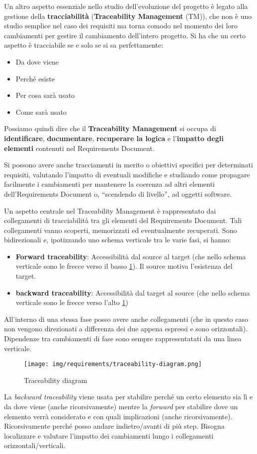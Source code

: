 Un altro aspetto essenziale nello studio dell'evoluzione del progetto è legato
alla gestione della \textbf{tracciabilità} (\textbf{Traceability Management}
(TM)), che non è uno studio semplice nel caso dei requisiti ma torna comodo nel
momento dei loro cambiamenti per gestire il cambiamento dell'intero progetto. Si
ha che un certo aspetto è tracciabile se e solo se si sa perfettamente:
\begin{itemize}
      \item Da dove viene
      \item Perché esiste
      \item Per cosa sarà usato
      \item Come sarà usato
\end{itemize}
Possiamo quindi dire che il \textbf{Traceability Management} si occupa di \textbf{identificare},
\textbf{documentare}, \textbf{recuperare la logica} e l'\textbf{impatto degli elementi} contenuti nel
Requirements Document.

Si possono avere anche tracciamenti in merito o obiettivi specifici per determinati
requisiti, valutando l'impatto di eventuali modifiche e studiando come propagare
facilmente i cambiamenti per mantenere la coerenza ad altri elementi
dell'Requirements Document o, “scendendo di livello”, ad oggetti software.

Un aspetto centrale nel Traceability Management è rappresentato dai collegamenti
di tracciabilità tra gli elementi del Requirements Document. Tali collegamenti
vanno scoperti, memorizzati ed eventualmente recuperati. Sono bidirezionali e,
ipotizzando uno schema verticale tra le varie fasi, si hanno:
\begin{itemize}
      \item \textbf{Forward traceability}: Accessibilità dal source al target
            (che nello schema verticale sono le frecce verso il basso
            \ref{fig:traceability-diagram}). Il source motiva l'esistenza del
            target.
      \item \textbf{backward traceability}: Accessibilità dal target al source
            (che nello schema verticale sono le frecce verso l'alto
            \ref{fig:traceability-diagram})
\end{itemize}
All'interno di una stessa fase posso avere anche collegamenti (che in questo caso
non vengono direzionati a differenza dei due appena espressi e sono orizzontali).
Dipendenze tra cambiamenti di fase sono sempre rappresentatati da una linea verticale.
\begin{figure}[!ht]
      \centering
      \texttt{[image: img/requirements/traceability-diagram.png]}
      \caption{Traceability diagram}
      \label{fig:traceability-diagram}
\end{figure}
La \textit{backward traceability} viene usata per stabilire perché un certo
elemento sia lì e da dove viene (anche ricorsivamente) mentre la \textit{forward}
per stabilire dove un elemento verrà considerato e con quali implicazioni
(anche ricorsivamente). Ricorsivamente perché posso andare indietro/avanti di
più step. Bisogna localizzare e valutare l'impatto dei cambiamenti lungo i
collegamenti orizzontali/verticali.

